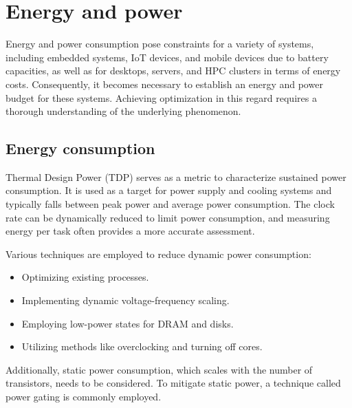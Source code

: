 \section{Energy and power}

Energy and power consumption pose constraints for a variety of systems, including embedded systems, IoT devices, and mobile devices due to battery capacities, as well as for desktops, servers, and HPC clusters in terms of energy costs.
Consequently, it becomes necessary to establish an energy and power budget for these systems. 
Achieving optimization in this regard requires a thorough understanding of the underlying phenomenon.

\subsection{Energy consumption}
Thermal Design Power (TDP) serves as a metric to characterize sustained power consumption. 
It is used as a target for power supply and cooling systems and typically falls between peak power and average power consumption. 
The clock rate can be dynamically reduced to limit power consumption, and measuring energy per task often provides a more accurate assessment.

Various techniques are employed to reduce dynamic power consumption:
\begin{itemize}
    \item Optimizing existing processes.
    \item Implementing dynamic voltage-frequency scaling.
    \item Employing low-power states for DRAM and disks.
    \item Utilizing methods like overclocking and turning off cores.
\end{itemize}
Additionally, static power consumption, which scales with the number of transistors, needs to be considered. 
To mitigate static power, a technique called power gating is commonly employed.
